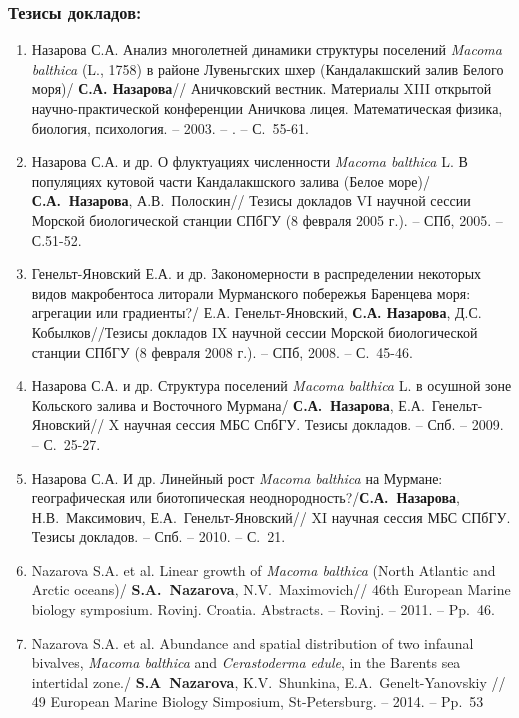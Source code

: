 {{\begin{small}
\subsubsection*{Тезисы докладов:}
\begin{enumerate}
\item Назарова С.А. Анализ многолетней динамики структуры поселений \textit{Macoma balthica} (L., 1758) в районе Лувеньгских шхер (Кандалакшский залив Белого моря)/ \textbf{С.А. Назарова}// Аничковский вестник. Материалы XIII открытой научно-практической конференции Аничкова лицея. Математическая физика, биология, психология. -- 2003. -- . -- С.~55-61.
\item Назарова С.А.  и др. О флуктуациях численности \textit{Macoma balthica} L. В популяциях кутовой части Кандалакшского залива (Белое море)/ \textbf{С.А.~Назарова}, А.В.~Полоскин// Тезисы докладов VI научной сессии Морской биологической станции СПбГУ (8 февраля 2005 г.). -- СПб, 2005. -- С.51-52.
\item Генельт-Яновский Е.А. и др. Закономерности в распределении некоторых видов макробентоса литорали Мурманского побережья Баренцева моря: агрегации или градиенты?/ Е.А. Генельт-Яновский, \textbf{С.А. Назарова}, Д.С. Кобылков//Тезисы докладов IX научной сессии Морской биологической станции СПбГУ (8 февраля 2008 г.). -- СПб, 2008. -- С.~45-46.
\item Назарова С.А. и др. Структура поселений \textit{Macoma balthica} L. в осушной зоне Кольского залива и Восточного Мурмана/ \textbf{С.А.~Назарова}, Е.А.~Генельт-Яновский// X научная сессия МБС СпбГУ. Тезисы докладов. -- Спб. -- 2009. -- С.~25-27.
\item Назарова С.А. И др. Линейный рост \textit{Macoma balthica} на Мурмане: географическая или биотопическая неоднородность?/\textbf{С.А.~Назарова},  Н.В.~Максимович, Е.А.~Генельт-Яновский// XI научная сессия МБС СПбГУ. Тезисы докладов. -- Спб. -- 2010. -- С.~21. 
\item Nazarova S.A. et al. Linear growth of \textit{Macoma balthica} (North Atlantic and Arctic oceans)/ \textbf{S.A.~Nazarova}, N.V.~Maximovich// 46th European Marine biology symposium. Rovinj. Croatia. Abstracts. -- Rovinj. -- 2011. -- Pp.~46.
\item Nazarova S.A. et al. Abundance and spatial distribution of two infaunal bivalves, \textit{Macoma balthica} and \textit{Cerastoderma edule}, in the Barents sea intertidal zone./ \textbf{S.A~Nazarova}, K.V.~Shunkina, E.A.~Genelt-Yanovskiy // 49 European Marine Biology Simposium, St-Petersburg. -- 2014. -- Pp.~53

\end{enumerate}
\end{small}}}
